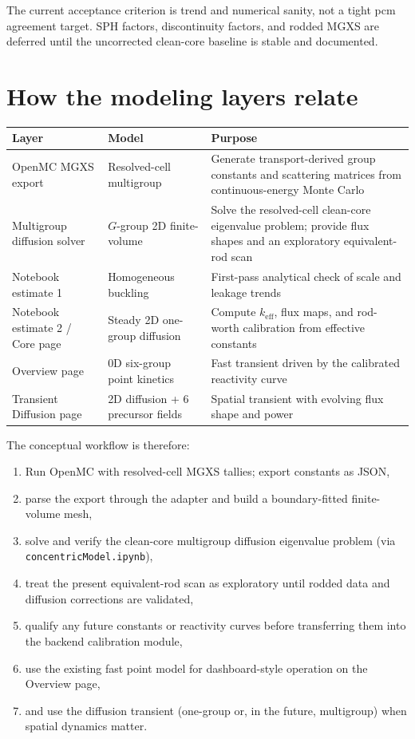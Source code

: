 \documentclass[11pt]{article}
\begin{document}
The current acceptance criterion is trend and numerical sanity, not a tight
pcm agreement target.  SPH factors, discontinuity factors, and rodded MGXS are
deferred until the uncorrected clean-core baseline is stable and documented.

\section{How the modeling layers relate}

\begin{center}
\begin{tabular}{p{3.2cm}p{4.0cm}p{5.3cm}}
\toprule
Layer & Model & Purpose \\
\midrule
OpenMC MGXS export & Resolved-cell multigroup & Generate transport-derived group constants and scattering matrices from continuous-energy Monte Carlo \\
\rule{0pt}{13pt}%
Multigroup diffusion solver & $G$-group 2D finite-volume & Solve the resolved-cell clean-core eigenvalue problem; provide flux shapes and an exploratory equivalent-rod scan \\
Notebook estimate 1 & Homogeneous buckling & First-pass analytical check of scale and leakage trends \\
Notebook estimate 2 / Core page & Steady 2D one-group diffusion & Compute $k_{\mathrm{eff}}$, flux maps, and rod-worth calibration from effective constants \\
Overview page & 0D six-group point kinetics & Fast transient driven by the calibrated reactivity curve \\
Transient Diffusion page & 2D diffusion + 6 precursor fields & Spatial transient with evolving flux shape and power \\
\bottomrule
\end{tabular}
\end{center}

The conceptual workflow is therefore:
\begin{enumerate}
  \item Run OpenMC with resolved-cell MGXS tallies; export constants as JSON,
  \item parse the export through the adapter and build a boundary-fitted
        finite-volume mesh,
  \item solve and verify the clean-core multigroup diffusion eigenvalue problem
        (via \texttt{concentricModel.ipynb}),
  \item treat the present equivalent-rod scan as exploratory until rodded data
        and diffusion corrections are validated,
  \item qualify any future constants or reactivity curves before transferring
        them into the backend calibration module,
  \item use the existing fast point model for dashboard-style operation on the
        Overview page,
  \item and use the diffusion transient (one-group or, in the future,
        multigroup) when spatial dynamics matter.
\end{enumerate}
\end{document}
